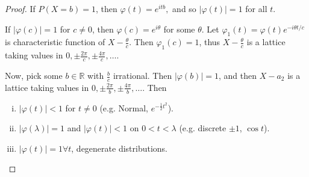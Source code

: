 \documentclass[10pt, oneside, reqno]{amsart}
\theoremstyle{plain}%
\theoremstyle{definition}
\theoremstyle{remark}
\renewcommand{\phi}{\varphi}
\newcommand{\R}{\mathbb{R}}
\begin{document}
\begin{proof}
    If $P(X = b) = 1$, then $\phi(t) = e^{itb},$ and so $| \phi(t) | = 1$ for all $t$.
    
    If $|\phi(c)| = 1$ for $ c \neq 0$, then $\phi(c) = e^{i\theta}$ for some $\theta$.  Let $\phi_1(t) = \phi(t) e^{-i \theta t/c}$ is characteristic function of $X - \frac{\theta}{c}$.  Then $\phi_1(c) = 1$, thus $X- \frac{\theta}{c}$ is a lattice taking values in $0, \pm \frac{2\pi}{c}, \pm \frac{4\pi}{c}, \dots$.  
    
    Now, pick some $b \in \R$ with $\frac{b}{c}$ irrational.  Then $|\phi(b) | = 1$, and then $X - a_2$ is a lattice taking values in $0, \pm \frac{2 \pi}{b}, \pm \frac{4 \pi}{b}, \dots$.  Then \begin{enumerate}[(i)]
        \item $|\phi(t)| < 1$ for $t \neq 0$ (e.g. Normal, $e^{-\frac{1}{2}t^2}$).
        \item $|\phi(\lambda) | = 1$ and $|\phi(t)| < 1$ on $0 < t < \lambda$ (e.g. discrete $\pm 1$, $\cos t$).
        \item $|\phi(t)| = 1 \forall t$, degenerate distributions.  
    \end{enumerate}
\end{proof}  
\end{document}
